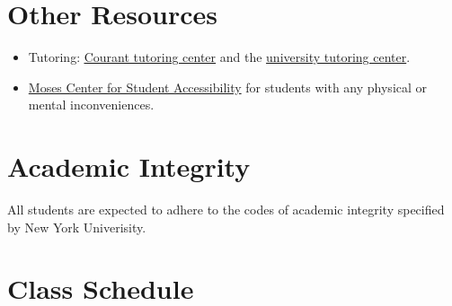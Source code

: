 \documentclass[letterpaper]{inzane_syllabus} %
\begin{document}
\section{Other Resources}
\begin{itemize}
  \item Tutoring: \href{https://math.nyu.edu/dynamic/undergrad/ba-cas/tutoring/}{\underline{Courant tutoring center}} and the \href{https://www.nyu.edu/students/academic-services/undergraduate-advisement/academic-resource-center/tutoring-and-learning.html}{university tutoring center}.
  \item \href{https://www.nyu.edu/about/leadership-university-administration/office-of-the-president/office-of-the-provost/university-life/office-of-studentaffairs/student-health-center/moses-center-for-student-accessibility.html}{Moses Center for Student Accessibility} for students with any physical or mental inconveniences.
\end{itemize}

\vspace{0.5cm}
\section{Academic Integrity}
All students are expected to adhere to the codes of academic integrity specified by New York Univerisity.

\newpage
\makeFullPage
\section{Class Schedule}
\end{document}
